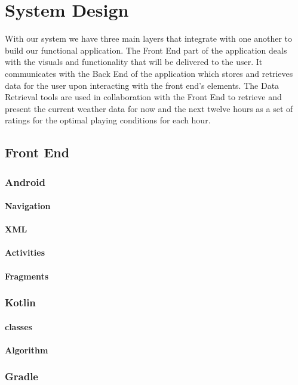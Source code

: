\chapter{System Design}
With our system we have three main layers that integrate with one another to build our functional application. The Front End part of the application deals with the visuals and functionality that will be delivered to the user. It communicates with the Back End of the application which stores and retrieves data for the user upon interacting with the front end's elements. The Data Retrieval tools are used in collaboration with the Front End to retrieve and present the current weather data for now and the next twelve hours as a set of ratings for the optimal playing conditions for each hour.

\section{Front End}
\subsection{Android}
\subsubsection{Navigation}
\subsubsection{XML}
\subsubsection{Activities}
\subsubsection{Fragments}
\subsection{Kotlin}
\subsubsection{classes}
\subsubsection{Algorithm}
\subsection{Gradle}
